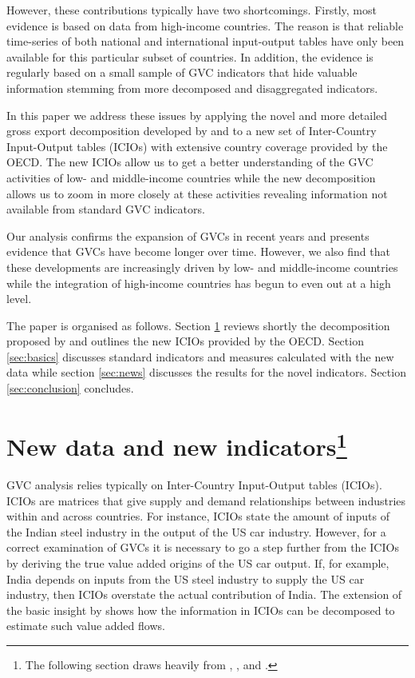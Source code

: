 \documentclass[11pt,a4paper]{article}
\begin{document}
However, these contributions typically have two shortcomings. Firstly, most evidence is based on data from high-income countries. The reason is that reliable time-series of both national and international input-output tables have only been available for this particular subset of countries. In addition, the evidence is regularly based on a small sample of GVC indicators that hide valuable information stemming from more decomposed and disaggregated indicators. 

In this paper we address these issues by applying the novel and more detailed gross export decomposition developed by \citet{zhwaetal13} and \citet{rokoetal14} to a new set of Inter-Country Input-Output tables (ICIOs) with extensive country coverage provided by the OECD. The new ICIOs allow us to get a better understanding of the GVC activities of low- and middle-income countries while the new decomposition allows us to zoom in more closely at these activities revealing information not available from standard GVC indicators.

Our analysis confirms the expansion of GVCs in recent years and presents evidence that GVCs have become longer over time. However, we also find that these developments are increasingly driven by low- and middle-income countries while the integration of high-income countries has begun to even out at a high level.

The paper is organised as follows. Section \ref{sec:data} reviews shortly the decomposition proposed by \citet[WWZ henceforth]{zhwaetal13} and outlines the new ICIOs provided by the OECD. Section \ref{sec:basics} discusses standard indicators and measures calculated with the new data while section \ref{sec:news} discusses the results for the novel indicators. Section \ref{sec:conclusion} concludes.



\section[New data and new indicators]{New data and new indicators\footnote{The following section draws heavily from \citet{zhwaetal13}, \citet{viku16}, and \cite{baquviku15}.}}\label{sec:data}

GVC analysis relies typically on Inter-Country Input-Output tables (ICIOs). ICIOs are matrices that give supply and demand relationships between industries within and across countries. For instance, ICIOs state the amount of inputs of the Indian steel industry in the output of the US car industry. However, for a correct examination of GVCs it is necessary to go a step further from the ICIOs by deriving the true value added origins of the US car output. If, for example, India depends on inputs from the US steel industry to supply the US car industry, then ICIOs overstate the actual contribution of India. The extension of the basic \citet{wale36} insight by \citet{dahuetal01} shows how the information in ICIOs can be decomposed to estimate such value added flows.
\end{document}
